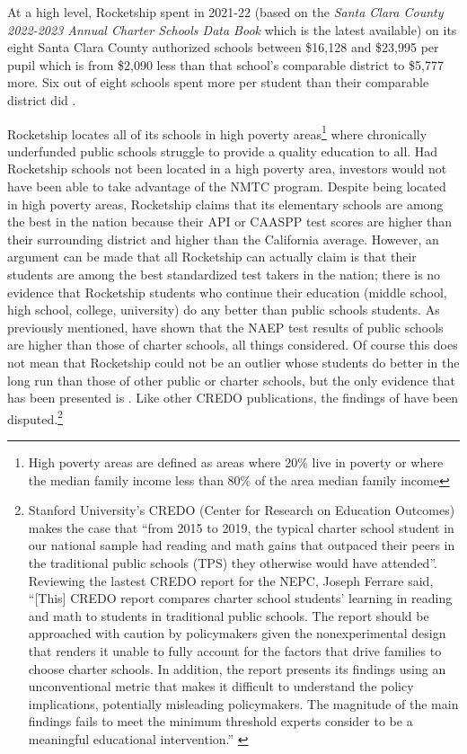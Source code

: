 At a high level, Rocketship spent in 2021-22 (based on the \textit{Santa Clara County 2022-2023 Annual Charter Schools Data Book} which is the latest available) on its eight Santa Clara County authorized schools between \$16,128 and \$23,995 per pupil which is from \$2,090 less than that school's comparable district to \$5,777 more. Six out of eight schools spent more per student than their comparable district did \parencite{SCCOE14-23}.

Rocketship locates all of its schools in high poverty areas\footnote{High poverty areas are defined as areas where 20\% live in poverty or where the median family income less than 80\% of the area median family income\parencite[13-14]{CDFI2020}} where chronically underfunded public schools struggle to provide a quality education to all. Had Rocketship schools not been located in a high poverty area, investors would not have been able to take advantage of the NMTC program. Despite being located in high poverty areas, Rocketship claims that its elementary schools are among the best in the nation \parencite{Abousalem2021} because their API or CAASPP test scores are higher than their surrounding district and higher than the California average. However, an argument can be made that all Rocketship can actually claim is that their students are among the best standardized test takers in the nation; there is no evidence that Rocketship students who continue their education (middle school, high school, college, university) do any better than public schools students. As previously mentioned, \textcite{Lubienski.Lubienski2014} have shown that the NAEP test results of public schools are higher than those of charter schools, all things considered. Of course this does not mean that Rocketship could not be an outlier whose students do better in the long run than those of other public or charter schools, but the only evidence that has been presented is \textcite{Raymond.etal2023}. Like other CREDO publications, the findings of \textcite{Raymond.etal2023} have been disputed.\footnote{Stanford University's CREDO (Center for Research on Education Outcomes) makes the case that ``from 2015 to 2019, the typical charter school student in our national sample had reading and math gains that outpaced their peers in the traditional public schools (TPS) they otherwise would have attended''. Reviewing the lastest CREDO report for the NEPC, Joseph Ferrare said, ``[This] CREDO report compares charter school students’ learning in reading and math to students in traditional public schools. The report should be approached with caution by policymakers given the nonexperimental design that renders it unable to fully account for the factors that drive families to choose charter schools. In addition, the report presents its findings using an unconventional metric that makes it difficult to understand the policy implications, potentially misleading policymakers. The magnitude of the main findings fails to meet the minimum threshold experts consider to be a meaningful educational intervention.'' \parencite{Ferrare2023}}

